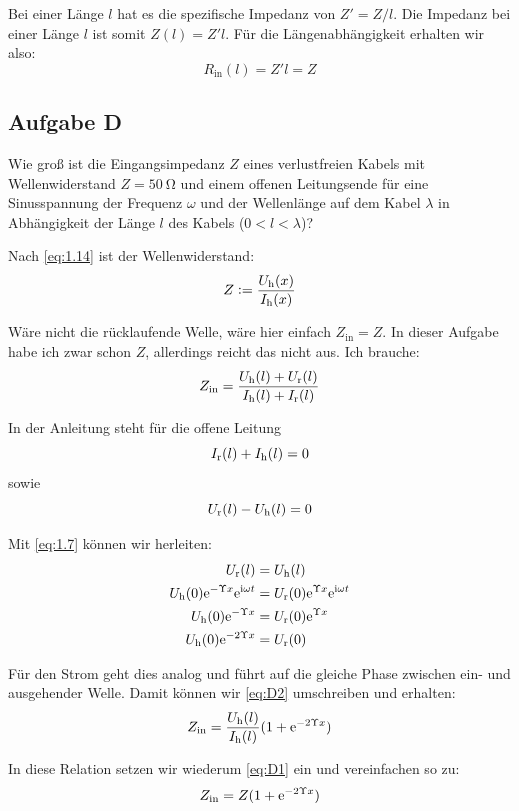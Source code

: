 Bei einer Länge $l$ hat es die spezifische Impedanz von $Z' = Z/l$. Die
Impedanz bei einer Länge $l$ ist somit $Z(l) = Z' l$. Für die
Längenabhängigkeit erhalten wir also:
\[
	R_\text{in}(l) = Z' l = Z
\]

\subsection{Aufgabe D}

\begin{problem}
	Wie groß ist die Eingangsimpedanz $Z$ eines verlustfreien Kabels mit
	Wellenwiderstand $Z = \SI{50}\ohm$ und einem offenen Leitungsende für eine
	Sinusspannung der Frequenz $\omega$ und der Wellenlänge auf dem Kabel
	$\lambda$ in Abhängigkeit der Länge $l$ des Kabels ($0 < l < \lambda$)?
\end{problem}

Nach \eqref{eq:1.14} ist der Wellenwiderstand:
\begin{equation}
	\label{eq:D1}
	Z := \frac{U_\text h(x)}{I_\text h(x)}
\end{equation}

Wäre nicht die rücklaufende Welle, wäre hier einfach $Z_\text{in} = Z$. In
dieser Aufgabe habe ich zwar schon $Z$, allerdings reicht das nicht aus. Ich
brauche:
\begin{equation}
	\label{eq:D2}
	Z_\text{in}
	= \frac{U_\text h (l) + U_\text r (l)}{I_\text h (l) + I_\text r (l)}
\end{equation}

In der Anleitung steht für die offene Leitung
\[
	I_\text r(l) + I_\text h(l) = 0
\]
sowie
\[
	U_\text r(l) - U_\text h(l) = 0
\]

Mit \eqref{eq:1.7} können wir herleiten:
\begin{align*}
	U_\text r(l) &= U_\text h(l) \\
	U_\text h(0) \mathrm e^{-\Upsilon x} \mathrm e^{\mathrm i \omega t} &= U_\text r(0) \mathrm e^{\Upsilon x} \mathrm e^{\mathrm i \omega t} \\
	U_\text h(0) \mathrm e^{-\Upsilon x} &= U_\text r(0) \mathrm e^{\Upsilon x} \\
	U_\text h(0) \mathrm e^{-2 \Upsilon x} &= U_\text r(0) \\
\end{align*}

Für den Strom geht dies analog und führt auf die gleiche Phase zwischen ein-
und ausgehender Welle. Damit können wir \eqref{eq:D2} umschreiben und erhalten:
\[
	Z_\text{in}
	= \frac{U_\text h (l)}{I_\text h (l)} (1 + \mathrm e^{-2 \Upsilon x})
\]

In diese Relation setzen wir wiederum \eqref{eq:D1} ein und vereinfachen so zu:
\[
	Z_\text{in}
	= Z (1 + \mathrm e^{-2 \Upsilon x})
\]

